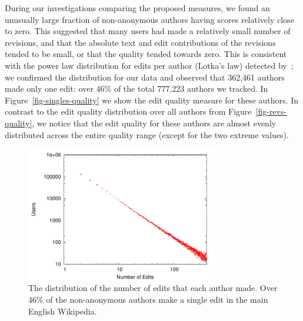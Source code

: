 During our investigations comparing the proposed measures,
we found an unusually large fraction of non-anonymous authors
having scores relatively close to zero.
This suggested that many users had made a relatively
small number of revisions, and that the absolute
text and edit contributions of the revisions tended to
be small, or that the quality tended towards zero.
This is consistent with the power law distribution
for edits per author (Lotka's law) detected by~\cite{Voss2005};
we confirmed the distribution for our data and observed
that 362,461 authors made only one edit:
over 46\% of the total 777,223 authors we tracked.
In Figure~\ref{fig-singles-quality} we show the edit quality
measure for these authors.
In contrast to the edit quality distribution over
all authors from Figure~\ref{fig-revs-quality},
we notice that the edit quality for these authors
are almost evenly distributed across the
entire quality range (except for the two extreme values).
%
\begin{figure}[tbph]
    \begin{center}
    \includegraphics[width=0.75\textwidth]{part-I10-contrib/graphs/plot-hist-numedits}
    \end{center}
    \caption[Distribution of authors over number of edits]{
    	The distribution of the number of edits that each author made.
	Over 46\% of the non-anonymous authors
	make a single edit in the main English Wikipedia.
    }
    \label{fig-hist-numedits}
\end{figure}
%

